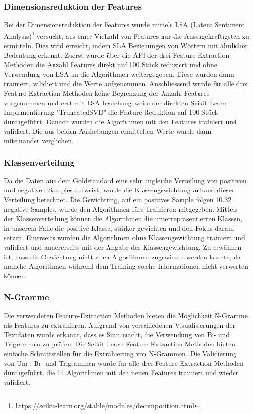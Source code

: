 \subsubsection{Dimensionsreduktion der Features}
Bei der Dimensionsreduktion der Features wurde mittels LSA (Latent Sentiment Analysis)\footnote{\url{https://scikit-learn.org/stable/modules/decomposition.html}} versucht, aus einer Vielzahl von Features nur die Aussagekräftigsten zu ermitteln.
Dies wird erreicht, indem SLA Beziehungen von Wörtern mit ähnlicher Bedeutung erkennt.
Zuerst wurde über die API der drei Feature-Extraction Methoden die Anzahl Features direkt auf 100 Stück reduziert und ohne Verwendung von LSA an die Algorithmen weitergegeben.
Diese wurden dann trainiert, validiert und die Werte aufgenommen.
Anschliessend wurde für alle drei Feature-Extraction Methoden keine Begrenzung der Anzahl Features vorgenommen und erst mit LSA beziehungsweise der direkten Scikit-Learn Implementierung "TruncatedSVD" die Feature-Reduktion auf 100 Stück durchgeführt.
Danach wurden die Algorithmen mit den Features trainiert und validiert.
Die aus beiden Aushebungen ermittelten Werte wurde dann miteinander verglichen.
\subsubsection{Klassenverteilung}
Da die Daten aus dem Goldstandard eine sehr ungleiche Verteilung von positiven und negativen Samples aufweist, wurde die Klassengewichtung anhand dieser Verteilung berechnet.
Die Gewichtung, auf ein positives Sample folgen 10.32 negative Samples, wurde den Algorithmen fürs Trainieren mitgegeben.
Mittels der Klassenverteilung können die Algorithmen die unterrepräsentierten Klassen, in unserem Falle die positive Klasse, stärker gewichten und den Fokus darauf setzen.
Einerseits wurden die Algorithmen ohne Klassengewichtung trainiert und validiert und andererseits mit der Angabe der Klassengewichtung.
Zu erwähnen ist, dass die Gewichtung nicht allen Algorithmen zugewiesen werden konnte, da manche Algorithmen während dem Training solche Informationen nicht verwerten können.
\subsubsection{N-Gramme}
Die verwendeten Feature-Extraction Methoden bieten die Möglichkeit N-Gramme als Features zu extrahieren.
Aufgrund von verschiedenen Visualisierungen der Textdaten wurde erkannt, dass es Sinn macht, die Verwendung von Bi- und Trigrammen zu prüfen.
Die Scikit-Learn Feature-Extraction Methoden bieten einfache Schnittstellen für die Extrahierung von N-Grammen.
Die Validierung von Uni-, Bi- und Trigrammen wurde für alle drei Feature-Extraction Methoden durchgeführt, die 14 Algorithmen mit den neuen Features trainiert und wieder validiert.

